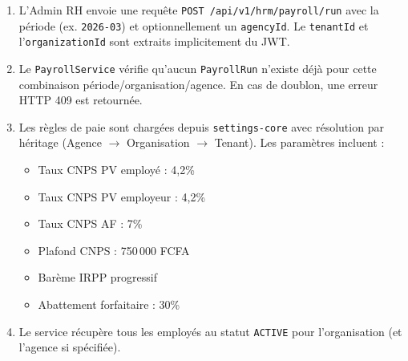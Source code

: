 \documentclass[a4paper,12pt,openany]{book}
\begin{document}
    \begin{enumerate}
        \item L'Admin RH envoie une requête \texttt{POST /api/v1/hrm/payroll/run} avec la période (ex. \texttt{2026-03}) et optionnellement un \texttt{agencyId}. Le \texttt{tenantId} et l'\texttt{organizationId} sont extraits implicitement du JWT.

        \item Le \texttt{PayrollService} vérifie qu'aucun \texttt{PayrollRun} n'existe déjà pour cette combinaison période/organisation/agence. En cas de doublon, une erreur HTTP 409 est retournée.

        \item Les règles de paie sont chargées depuis \texttt{settings-core} avec résolution par héritage (Agence $\rightarrow$ Organisation $\rightarrow$ Tenant). Les paramètres incluent :
        \begin{itemize}
            \item Taux CNPS PV employé : 4,2\%
            \item Taux CNPS PV employeur : 4,2\%
            \item Taux CNPS AF : 7\%
            \item Plafond CNPS : 750\,000 FCFA
            \item Barème IRPP progressif
            \item Abattement forfaitaire : 30\%
        \end{itemize}

        \item Le service récupère tous les employés au statut \texttt{ACTIVE} pour l'organisation (et l'agence si spécifiée).


\end{enumerate}
\end{document}
